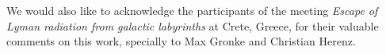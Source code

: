 \documentclass[twocolappendix]{latex/emulateapj}
\begin{document}
We would also like to acknowledge the participants of the meeting \textit{Escape of Lyman radiation from galactic labyrinths} at Crete, Greece, for their valuable comments on this work, specially to Max Gronke and Christian Herenz. \\





\end{document}
